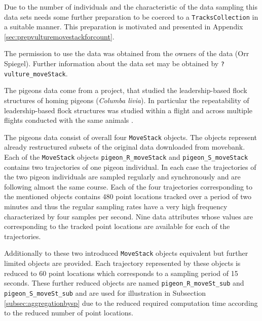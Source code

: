 \documentclass[12pt, oneside, a4paper]{scrbook}
\let\code=\texttt
\begin{document}
\par\medskip

Due to the number of individuals and the characteristic of the data sampling this data sets needs some further preparation to be coerced to a \code{TracksCollection} in a suitable manner. This preparation is motivated and presented in Appendix \ref{sec:prepvulturemovestackforcount}.
\par\medskip

The permission to use the data was obtained from the owners of the data (Orr Spiegel).
Further information about the data set may be obtained by \code{?vulture\_moveStack}.
\par\medskip




The pigeons data come from a project, that studied the leadership-based flock structures of homing
pigeons (\textit{Columba livia}). In particular the repeatability of leadership-based flock structures was studied within a flight and across multiple flights conducted with the same animals \citep{santos_temporal_2014}.
\par\medskip

The pigeons data consist of overall four \code{MoveStack} objects. The objects represent already restructured subsets of the original data downloaded from movebank. Each of the \code{MoveStack} objects \code{pigeon\_R\_moveStack} and \code{pigeon\_S\_moveStack} contains two trajectories of one pigeon individual. In each case the trajectories of the two pigeon individuals are sampled regularly and synchronously and are following almost the same course. Each of the four trajectories corresponding to the mentioned objects contains 480 point locations tracked over a period of two minutes and thus the regular sampling rates have a very high frequency characterized by four samples per second. Nine data attributes whose values are corresponding to the tracked point locations are available for each of the trajectories.
\par\medskip

Additionally to these two introduced \code{MoveStack} objects equivalent but further limited objects are provided. Each trajectory represented by these objects is reduced to 60 point locations which corresponds to a sampling period of 15 seconds. These further reduced objects are named \code{pigeon\_R\_moveSt\_sub} and \code{pigeon\_S\_moveSt\_sub} and are used for illustration in Subsection \ref{subsec:aggregationbysp} due to the reduced required computation time according to the reduced number of point locations.
\par\medskip
\end{document}
